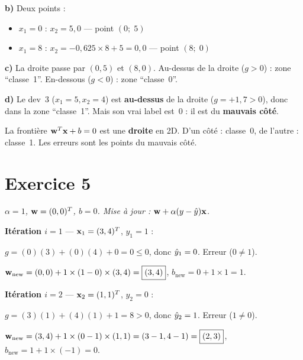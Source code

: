 \textbf{b)} Deux points :
\begin{itemize}
    \item $x_1 = 0$ : $x_2 = 5{,}0$ --- point $(0;\; 5)$
    \item $x_1 = 8$ : $x_2 = -0{,}625 \times 8 + 5 = 0{,}0$ --- point $(8;\; 0)$
\end{itemize}

\textbf{c)} La droite passe par $(0, 5)$ et $(8, 0)$.
Au-dessus de la droite ($g > 0$) : zone ``classe~1''.
En-dessous ($g < 0$) : zone ``classe~0''.

\textbf{d)} Le dev~3 ($x_1=5, x_2=4$) est \textbf{au-dessus} de la droite ($g = +1{,}7 > 0$),
donc dans la zone ``classe~1''. Mais son vrai label est~0 : il est du \textbf{mauvais c\^{o}t\'{e}}.

\begin{retenirbox}
    La fronti\`{e}re $\mathbf{w}^T\mathbf{x} + b = 0$ est une \textbf{droite} en 2D. D'un c\^{o}t\'{e} : classe~0,
    de l'autre : classe~1. Les erreurs sont les points du mauvais c\^{o}t\'{e}.
\end{retenirbox}

\section*{Exercice 5 \hfill \exointermediaire}
\textit{$\alpha = 1$, $\mathbf{w} = (0, 0)^T$, $b = 0$. Mise \`{a} jour : $\mathbf{w} + \alpha(y-\hat{y})\mathbf{x}$.}

\separateur

\textbf{It\'{e}ration $i = 1$} --- $\mathbf{x}_1 = (3, 4)^T$, $y_1 = 1$ :

$g = (0)(3) + (0)(4) + 0 = 0 \leq 0$, donc $\hat{y}_1 = 0$. Erreur ($0 \neq 1$).

$\mathbf{w}_{\text{new}} = (0, 0) + 1 \times (1 - 0) \times (3, 4) = \boxed{(3, 4)}$,\quad
$b_{\text{new}} = 0 + 1 \times 1 = \boxed{1}$.

\medskip
\textbf{It\'{e}ration $i = 2$} --- $\mathbf{x}_2 = (1, 1)^T$, $y_2 = 0$ :

$g = (3)(1) + (4)(1) + 1 = 8 > 0$, donc $\hat{y}_2 = 1$. Erreur ($1 \neq 0$).

$\mathbf{w}_{\text{new}} = (3, 4) + 1 \times (0 - 1) \times (1, 1) = (3-1, 4-1) = \boxed{(2, 3)}$,\quad
$b_{\text{new}} = 1 + 1 \times (-1) = \boxed{0}$.

